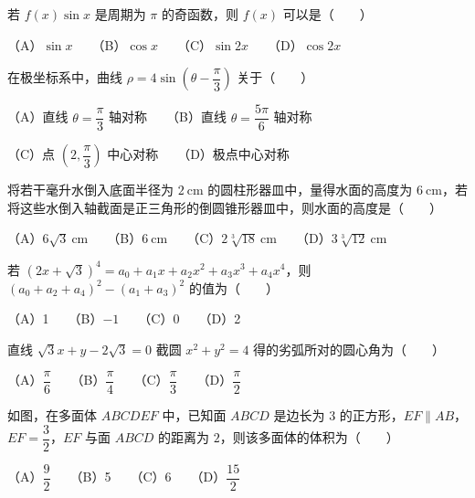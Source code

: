 \begin{question}
若 $f(x)\sin x$ 是周期为 $\pi$ 的奇函数，则 $f(x)$ 可以是\mbox{（　　）}

（A）$\sin x$　　（B）$\cos x$　　（C）$\sin2x$　　（D）$\cos2x$

\end{question}
\begin{question}
在极坐标系中，曲线 $\rho=4\sin\left(\theta-\dfrac\pi3\right)$ 关于\mbox{（　　）}

（A）直线 $\theta=\dfrac\pi3$ 轴对称　　（B）直线 $\theta=\dfrac{5\pi}6$ 轴对称

（C）点 $\left(2,\dfrac\pi3\right)$ 中心对称　　（D）极点中心对称

\end{question}
\begin{question}
将若干毫升水倒入底面半径为 $2\ \mathrm{cm}$ 的圆柱形器皿中，量得水面的高度为 $6\ \mathrm{cm}$，若将这些水倒入轴截面是正三角形的倒圆锥形器皿中，则水面的高度是\mbox{（　　）}

（A）$6\sqrt3\ \mathrm{cm}$　　（B）$6\ \mathrm{cm}$　　（C）$2\sqrt[3]{18}\ \mathrm{cm}$　　（D）$3\sqrt[3]{12}\ \mathrm{cm}$

\end{question}
\begin{question}
若 $(2x+\sqrt3)^4=a_0+a_1x+a_2x^2+a_3x^3+a_4x^4$，则 $(a_0+a_2+a_4)^2-(a_1+a_3)^2$ 的值为\mbox{（　　）}

（A）1　　（B）$-1$　　（C）0　　（D）2

\end{question}
\begin{question}
直线 $\sqrt3x+y-2\sqrt3=0$ 截圆 $x^2+y^2=4$ 得的劣弧所对的圆心角为\mbox{（　　）}

（A）$\dfrac\pi6$　　（B）$\dfrac\pi4$　　（C）$\dfrac\pi3$　　（D）$\dfrac\pi2$

\Needspace{0.4\textheight}
\end{question}
\begin{question}
如图，在多面体 $ABCDEF$ 中，已知面 $ABCD$ 是边长为 $3$ 的正方形，$EF\parallel AB$，$EF=\dfrac32$，$EF$ 与面 $ABCD$ 的距离为 $2$，则该多面体的体积为\mbox{（　　）}
\nopagebreak[4]
\begin{center}\end{center}
\nopagebreak[4]
（A）$\dfrac92$　　（B）5　　（C）6　　（D）$\dfrac{15}2$

\end{question}
